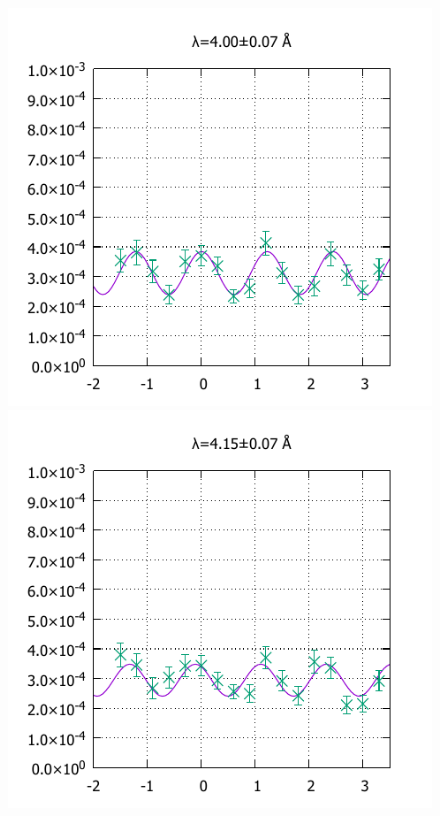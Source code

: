 \begin{figure}[H]
\centering
\begin{minipage}{0.33\hsize}
\includegraphics[width=\imgwidth]{phase_shifter/wl/wlf9.pdf}
\end{minipage}
\begin{minipage}{0.33\hsize}
\includegraphics[width=\imgwidth]{phase_shifter/wl/wlf10.pdf}
\end{minipage}

\end{figure}

